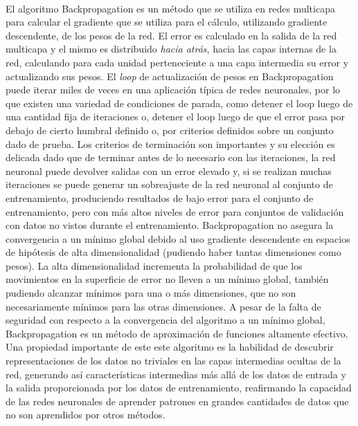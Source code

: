 \paragraph{}El algoritmo Backpropagation es un método que se utiliza en redes multicapa para calcular el gradiente que se utiliza para el cálculo, utilizando gradiente descendente, de los pesos de la red. El error es calculado en la salida de la red multicapa y el mismo es distribuido \textit{hacia atrás}, hacia las capas internas de la red, calculando para cada unidad perteneciente a una capa intermedia su error y actualizando sus pesos. El \textit{loop} de actualización de pesos en Backpropagation puede iterar miles de veces en una aplicación típica de redes neuronales, por lo que existen una variedad de condiciones de parada, como detener el loop luego de una cantidad fija de iteraciones o, detener el loop luego de que el error pasa por debajo de cierto humbral definido o, por criterios definidos sobre un conjunto dado de prueba. Los criterios de terminación son importantes y su elección es delicada dado que de terminar antes de lo necesario con las iteraciones, la red neuronal puede devolver salidas con un error elevado y, si se realizan muchas iteraciones se puede generar un sobreajuste de la red neuronal al conjunto de entrenamiento, produciendo resultados de bajo error para el conjunto de entrenamiento, pero con más altos niveles de error para conjuntos de validación con datos no vistos durante el entrenamiento. Backpropagation no asegura la convergencia a un mínimo global debido al uso gradiente descendente en espacios de hipótesis de alta dimensionalidad (pudiendo haber tantas dimensiones como pesos). La alta dimensionalidad incrementa la probabilidad de que los movimientos en la superficie de error no lleven a un mínimo global, también pudiendo alcanzar mínimos para una o más dimensiones, que no son necesariamente mínimos para las otras dimensiones. A pesar de la falta de seguridad con respecto a la convergencia del algoritmo a un mínimo global, Backpropagation es un método de aproximación de funciones altamente efectivo. Una propiedad importante de este este algoritmo es la habilidad de descubrir representaciones de los datos no triviales en las capas intermedias ocultas de la red, generando así características intermedias más allá de los datos de entrada y la salida proporcionada por los datos de entrenamiento, reafirmando la capacidad de las redes neuronales de aprender patrones en grandes cantidades de datos que no son aprendidos por otros métodos. 

